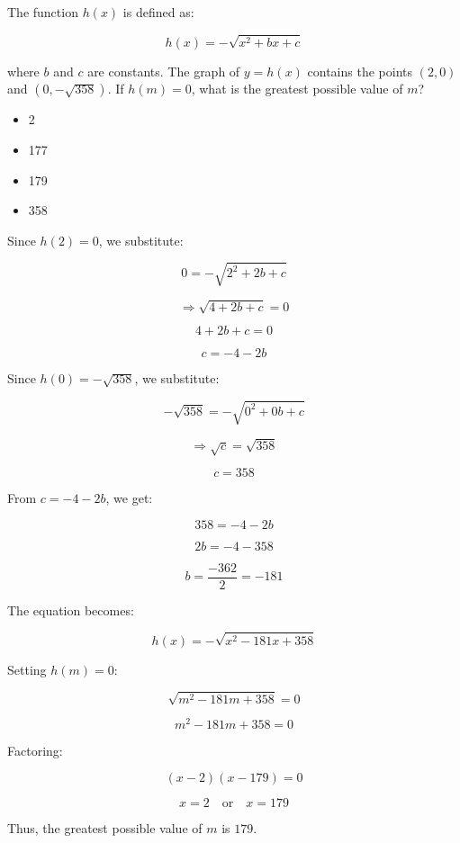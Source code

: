 \documentclass{article}
\begin{document}
\vspace{1cm}

\begin{tcolorbox}[colback=blue!10, colframe=blue!50!black, title=Question 21]
The function \( h(x) \) is defined as:

\[
h(x) = -\sqrt{x^2 + bx + c}
\]

where \( b \) and \( c \) are constants. The graph of \( y = h(x) \) contains the points \( (2,0) \) and \( (0, -\sqrt{358}) \). If \( h(m) = 0 \), what is the greatest possible value of \( m \)?

\begin{itemize}
    \item[A.] 2
    \item[B.] 177
    \item[C.] 179 
    \item[D.] 358
\end{itemize}
\end{tcolorbox}

\begin{tcolorbox}[colback=green!5!white, colframe=green!75!black, title=Solution]
Since \( h(2) = 0 \), we substitute:

\[
0 = -\sqrt{2^2 + 2b + c}
\]

\[
\Rightarrow \sqrt{4 + 2b + c} = 0
\]

\[
4 + 2b + c = 0
\]

\[
c = -4 - 2b
\]

Since \( h(0) = -\sqrt{358} \), we substitute:

\[
-\sqrt{358} = -\sqrt{0^2 + 0b + c}
\]

\[
\Rightarrow \sqrt{c} = \sqrt{358}
\]

\[
c = 358
\]

From \( c = -4 - 2b \), we get:

\[
358 = -4 - 2b
\]

\[
2b = -4 - 358
\]

\[
b = \frac{-362}{2} = -181
\]

The equation becomes:

\[
h(x) = -\sqrt{x^2 - 181x + 358}
\]

Setting \( h(m) = 0 \):

\[
\sqrt{m^2 - 181m + 358} = 0
\]

\[
m^2 - 181m + 358 = 0
\]

Factoring:

\[
(x-2)(x-179) = 0
\]

\[
x = 2 \quad \text{or} \quad x = 179
\]

Thus, the greatest possible value of \( m \) is \( 179 \).
\end{tcolorbox}
\end{document}
